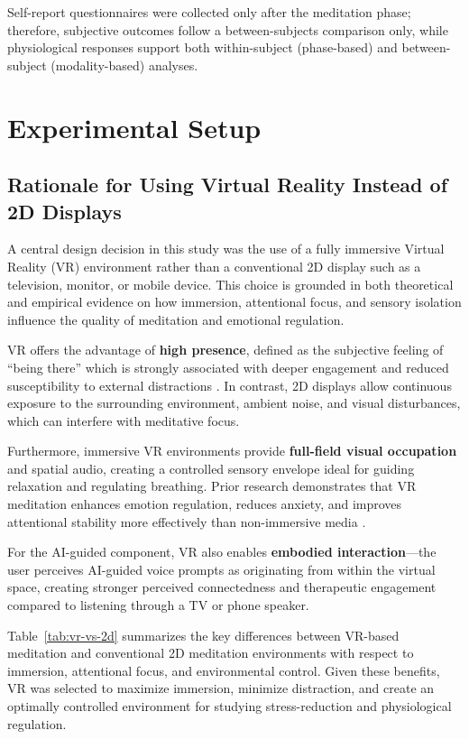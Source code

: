 Self-report questionnaires were collected only after the meditation phase; therefore, subjective outcomes follow a between-subjects comparison only, while physiological responses support both within-subject (phase-based) and between-subject (modality-based) analyses.

\section{Experimental Setup}
\subsection{Rationale for Using Virtual Reality Instead of 2D Displays}

A central design decision in this study was the use of a fully immersive Virtual Reality (VR) environment rather than a conventional 2D display such as a television, monitor, or mobile device. This choice is grounded in both theoretical and empirical evidence on how immersion, attentional focus, and sensory isolation influence the quality of meditation and emotional regulation.

VR offers the advantage of \textbf{high presence}, defined as the subjective feeling of “being there” which is strongly associated with deeper engagement and reduced susceptibility to external distractions \cite{slater2018immersive,jerald2016vrbook}. In contrast, 2D displays allow continuous exposure to the surrounding environment, ambient noise, and visual disturbances, which can interfere with meditative focus.

Furthermore, immersive VR environments provide \textbf{full-field visual occupation} and spatial audio, creating a controlled sensory envelope ideal for guiding relaxation and regulating breathing. Prior research demonstrates that VR meditation enhances emotion regulation, reduces anxiety, and improves attentional stability more effectively than non-immersive media \cite{tarrant2018virtual,liszio2018nature}. 

For the AI-guided component, VR also enables \textbf{embodied interaction}—the user perceives AI-guided voice prompts as originating from within the virtual space, creating stronger perceived connectedness and therapeutic engagement compared to listening through a TV or phone speaker.  

Table~\ref{tab:vr-vs-2d} summarizes the key differences between VR-based meditation and conventional 2D meditation environments with respect to immersion, attentional focus, and environmental control. Given these benefits, VR was selected to maximize immersion, minimize distraction, and create an optimally controlled environment for studying stress-reduction and physiological regulation.


